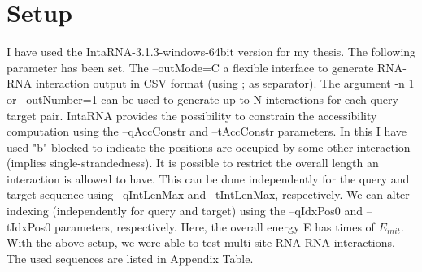 \documentclass[twoside,a4paper]{report}
\numberwithin{equation}{section}
\begin{document}
	
	\section{Setup}
	
	I have used the IntaRNA-3.1.3-windows-64bit version for my thesis. The following parameter has been set. The --outMode=C a flexible interface to generate RNA-RNA interaction output in CSV format (using ; as separator). The argument -n 1 or --outNumber=1 can be used to generate up to N interactions for each query-target pair. IntaRNA provides the possibility to constrain the accessibility computation using the --qAccConstr and --tAccConstr parameters. In this I have used "b" blocked to indicate the positions are occupied by some other interaction (implies single-strandedness). It is possible to restrict the overall length an interaction is allowed to have. This can be done independently for the query and target sequence using --qIntLenMax and --tIntLenMax, respectively. We can alter indexing (independently for query and target) using the --qIdxPos0 and --tIdxPos0 parameters, respectively. Here, the overall energy E has times of $E_{init}$.\\
	
	
	With the above setup, we were able to test multi-site RNA-RNA interactions. The used sequences are listed in Appendix Table.\\
	
%	
	
		
		
\end{document}
